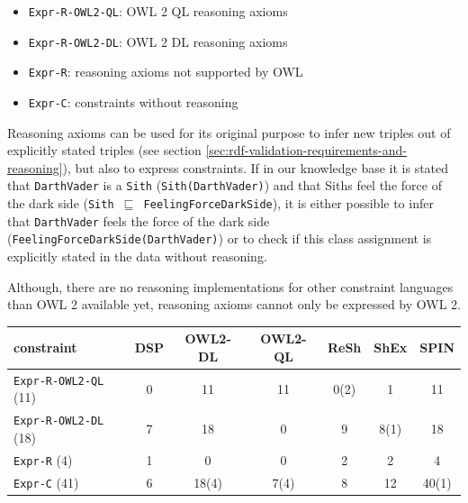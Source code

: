 \documentclass{llncs}
\newcommand{\ms}[1]{\texttt{#1}}
\newcommand{\tb}[1]{\todo[size=\small, color=green!40]{\textbf{Thomas:} #1}}
\newenvironment{evaluation}{
  \begin{tabular}{l|c|c|c|c|c|c}
  \hline
  \textbf{constraint} & \textbf{DSP} & \textbf{OWL2-DL} & \textbf{OWL2-QL} & \textbf{ReSh} & \textbf{ShEx} & \textbf{SPIN} \\
  \hline

}{
  \hline
  \end{tabular}
  \linebreak
}
\begin{document}
\begin{itemize}
	\item \ms{Expr-R-OWL2-QL}: OWL 2 QL reasoning axioms
	\item \ms{Expr-R-OWL2-DL}: OWL 2 DL reasoning axioms
	\item \ms{Expr-R}: reasoning axioms not supported by OWL
	\item \ms{Expr-C}: constraints without reasoning
\end{itemize}

Reasoning axioms can be used for its original purpose to infer new triples out of explicitly stated triples (see section \ref{sec:rdf-validation-requirements-and-reasoning}), but also to express constraints.
If in our knowledge base it is stated that \ms{DarthVader} is a \ms{Sith} (\ms{Sith(DarthVader)}) and that Siths feel the force of the dark side (\ms{Sith $\sqsubseteq$ FeelingForceDarkSide}), it is either possible to infer that \ms{DarthVader} feels the force of the dark side (\ms{FeelingForceDarkSide(DarthVader)}) 
or to check if this class assignment is explicitly stated in the data without reasoning.  

Although, there are no reasoning implementations for other constraint languages than OWL 2 available yet, 
reasoning axioms cannot only be expressed by OWL 2.

  
%
%
%
	
\begin{center}
\begin{evaluation}
\ms{Expr-R-OWL2-QL} (11) & 0 & 11 & 11 & 0(2) & 1 & 11 \\
\ms{Expr-R-OWL2-DL} (18) & 7 & 18 & 0 & 9 & 8(1) & 18 \\
\ms{Expr-R} (4) & 1 & 0 & 0 & 2 & 2 & 4 \\ 
\ms{Expr-C} (41) & 6 & 18(4) & 7(4) & 8 & 12 & 40(1)\\
\end{evaluation}
\end{center}
\end{document}
